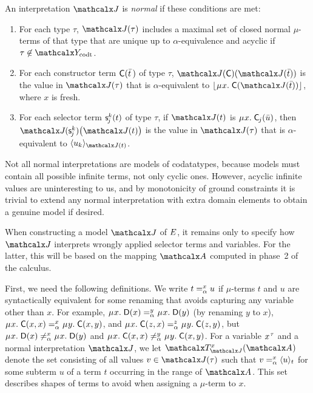 \begin{definition}
\afterDot%
\label{def:norm-interpretation}%
\rm
An interpretation $\J$ is \emph{normal} if these conditions are met:
\begin{enumerate}
\item
For each type $\tau$,
$\interp{\J}{\tau}$ includes a maximal set of closed normal $\mu$-terms of that type that are
unique up to $\alpha$-equivalence and acyclic if $\tau \not\in \Codata$.
\item
For each constructor term $\const{C}( \vec t \,)$ of type $\tau$,
$\interp{\J}{\const{C}}( \interp{\J}{\vec t} )$ is the value
in $\interp{\J}{\tau}$ that is $\alpha$-equivalent to
$\nf{\MU x.\; \const{C}( \interp{\J}{\vec t} )}$, where $x$ is fresh.
\item
For each selector term $\const s^k_{\negvthinspace j}( t )$ of type $\tau$, %
if $\interp{\J}{t}$ is $\MU x.\; \const{C}_{\negvthinspace j}( \vec u )$,
then $\J\negvvthinspace( \const s^k_{\negvthinspace j} )\bigl( \interp{\J}{t} \bigr)$ is the value
in $\interp{\J}{\tau}$ that is $\alpha$-equivalent to
$\expand{\interp{\J}{t}}{u_k}$.
\end{enumerate}
\end{definition}

Not all normal interpretations are models of codatatypes, because
models must contain all possible infinite terms, not only cyclic ones. However,
acyclic infinite values are uninteresting to us, and by monotonicity of ground
constraints it is trivial to extend any normal interpretation with extra
domain elements to obtain a genuine model if desired. %

When constructing a model $\J$ of $\Ec$,
it remains only to specify how $\J$ interprets wrongly applied selector terms and variables.
For the latter, this will be based on the mapping $\Val$ computed in phase~2 of the calculus.

{
First, we need the following definitions.
We write $t \vsimv{x} u$ if $\mu$-terms $t$ and $u$ are syntactically equivalent
for some renaming that avoids capturing any variable other than $x$.
For example,
$\MU x.\; \const{D}( x ) \vsimv{y} \MU x.\; \const{D}( y )$
(by renaming $y$ to $x$),
$\MU x.\; \const{C}( x, x ) \vsimv{x} \MU y.\; \const{C}( x, y )$, and
$\MU x.\; \const{C}( z, x ) \vsimv{z} \MU y.\; \const{C}( z, y )$,
but
$\MU x.\; \const{D}( x ) \not\vsimv{x} \MU x.\; \const{D}( y )$ and
$\MU x.\; \const{C}( x, x ) \not\vsimv{y} \MU y.\; \const{C}( x, y )$.
For a variable $x\typ{\tau}$ and a normal interpretation $\J$,
we let $\Terms_{\smash{\J}}^x( \Val )$ denote the set consisting of all values
$v \in \interp{\J}{\tau}$
such that $v \vsimv{x} \expand{t}{u}$ for some subterm $u$ of a term $t$
occurring in the range of $\Val$. This set describes shapes of terms to avoid
when assigning a $\mu$-term to $x$.

}

